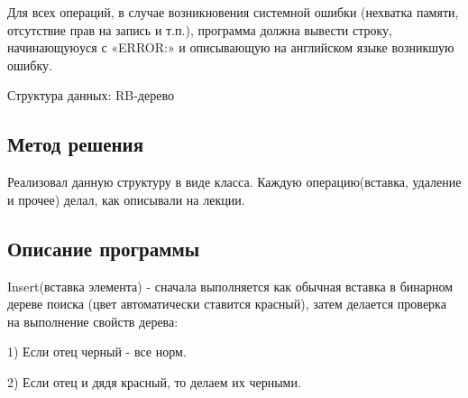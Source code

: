 \documentclass[12pt]{article}
\begin{document}
Для всех операций, в случае возникновения системной ошибки
(нехватка памяти, отсутствие прав на запись и т.п.), программа
должна вывести строку, начинающуюуся с «ERROR:» и описывающую
на английском языке возникшую ошибку.  

Структура данных: RB-дерево

\subsection*{Метод решения}

Реализовал данную структуру в виде класса. Каждую операцию(вставка, удаление и прочее) делал, 
как описывали на лекции.

\subsection*{Описание программы}

Insert(вставка элемента) - сначала выполняется как обычная вставка в бинарном дереве поиска
(цвет автоматически ставится красный), затем делается проверка на выполнение свойств дерева:  

1) Если отец черный - все норм.  

2) Если отец и дядя красный, то делаем их черными.  
\end{document}

